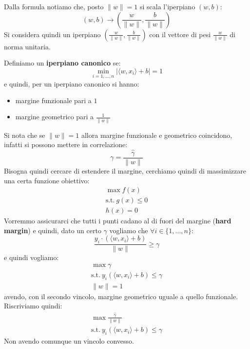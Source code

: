 Dalla formula notiamo che, posto $\| w \| = 1$ si scala l'iperpiano $(w, b)$:
\begin{equation}
    (w, b) \to \left(\frac{w}{\|w\|}, \frac{b}{\| w\|}\right)
\end{equation}
Si considera quindi un iperpiano $\left(\frac{w}{\|w\|}, \frac{b}{\| w\|}\right)$
con il vettore di pesi $\frac{w}{\| w \|}$ di norma unitaria.
\begin{definizione}
    Definiamo un \textbf{iperpiano canonico} se:
    \begin{equation}
        \min_{i = 1, \dots, n} |\langle w, x_i \rangle + b| =  1
    \end{equation}
    e quindi, per un iperpiano canonico si hanno:
    \begin{itemize}
        \item margine funzionale pari a $1$
        \item margine geometrico pari a $\frac{1}{\| w \|}$
    \end{itemize}
\end{definizione}
Si nota che se $\| w \| = 1$ allora margine funzionale e geometrico coincidono,
infatti si possono mettere in correlazione:
\begin{equation}
    \gamma = \frac{\hat{\gamma}}{\| w \|}
\end{equation}
Bisogna quindi cercare di estendere il margine, cerchiamo quindi di massimizzare
una certa funzione obiettivo:
\begin{equation*}
    \begin{aligned}
        \max f(x) \\ \text{s.t.} \ g(x) \leq 0 \\ h(x) = 0
    \end{aligned}
\end{equation*}
Vorremmo assicurarci che tutti i punti cadano al di fuori del margine
(\textbf{hard margin}) e quindi, dato un certo $\gamma$ vogliamo che $\forall i
    \in \{1, \dots, n\}$:
\begin{equation}
    \frac{y_i \cdot (\langle w, x_i \rangle + b)}{\| w \|} \geq \gamma
\end{equation}
e quindi vogliamo:
\begin{equation*}
    \begin{aligned}
        \max \gamma \\ \text{s.t.} \ y_i (\langle w, x_i \rangle + b) \leq
        \gamma      \\ \| w \| = 1
    \end{aligned}
\end{equation*}
avendo, con il secondo vincolo, margine geometrico uguale a quello funzionale.
Riscriviamo quindi:
\begin{equation*}
    \begin{aligned}
        \max \frac{\hat{\gamma}}{\|w\|} \\ \text{s.t.} \ y_i(\langle w, x_i
        \rangle + b) \leq \gamma
    \end{aligned}
\end{equation*}
Non avendo comunque un vincolo convesso.

